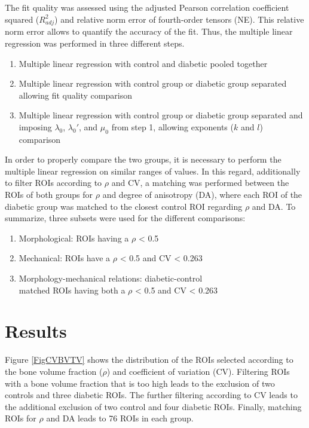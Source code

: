 \documentclass[a4paper,fleqn]{DC_ArtStyle}
\begin{document}
	The fit quality was assessed using the adjusted Pearson correlation coefficient squared ($R_{adj}^{2}$) and relative norm error of fourth-order tensors (NE).
	This relative norm error allows to quantify the accuracy of the fit.
	Thus, the multiple linear regression was performed in three different steps.
	\begin{enumerate}
		\item Multiple linear regression with control and diabetic pooled together
		\item Multiple linear regression with control group or diabetic group separated allowing fit quality comparison
		\item Multiple linear regression with control group or diabetic group separated and imposing $\lambda_0$, $\lambda_0'$, and $\mu_0$ from step 1, allowing exponents ($k$ and $l$) comparison
	\end{enumerate}
	In order to properly compare the two groups, it is necessary to perform the multiple linear regression on similar ranges of values.
	In this regard, additionally to filter ROIs according to $\rho$ and CV, a matching was performed between the ROIs of both groups for $\rho$ and degree of anisotropy (DA), where each ROI of the diabetic group was matched to the closest control ROI regarding $\rho$ and DA.
	To summarize, three subsets were used for the different comparisons:
	\begin{enumerate}
		\item Morphological: ROIs having a $\rho$ < 0.5
		\item Mechanical: ROIs have a $\rho$ < 0.5 and CV < 0.263
		\item Morphology-mechanical relations: diabetic-control\\matched ROIs having both a $\rho$ < 0.5 and CV < 0.263
	\end{enumerate}


	\section{Results}
	Figure \ref{FigCVBVTV} shows the distribution of the ROIs selected according to the bone volume fraction ($\rho$) and coefficient of variation (CV).
	Filtering ROIs with a bone volume fraction that is too high leads to the exclusion of two controls and three diabetic ROIs.
	The further filtering according to CV leads to the additional exclusion of two control and four diabetic ROIs.
	Finally, matching ROIs for $\rho$ and DA leads to 76 ROIs in each group.
   
\end{document}
